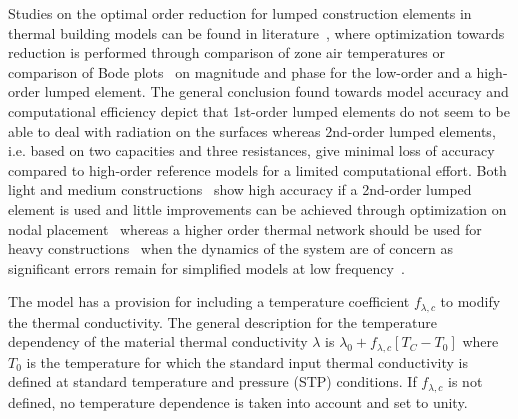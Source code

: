 
Studies on the optimal order reduction for lumped construction elements in thermal building models can be found in literature~\cite{Tindale1993,Gouda2000,Gouda2002,Wang2006,Xu2007}, where optimization towards reduction is performed through comparison of zone air temperatures or comparison of Bode plots~\cite{Bode1945} on magnitude and phase for the low-order and a high-order lumped element. The general conclusion found towards model accuracy and computational efficiency depict that 1st-order lumped elements do not seem to be able to deal with radiation on the surfaces whereas 2nd-order lumped elements, i.e. based on two capacities and three resistances, give minimal loss of accuracy compared to high-order reference models for a limited computational effort. Both light and medium constructions~\cite{ASHRAE2009} show high accuracy if a 2nd-order lumped element is used and little improvements can be achieved through optimization on nodal placement~\cite{Tindale1993,Gouda2002,Wang2006,Xu2007} whereas a higher order thermal network should be used for heavy constructions~\cite{ASHRAE2009} when the dynamics of the system are of concern as significant errors remain for simplified models at low frequency~\cite{Wang2006,Xu2007,Masy2008}.

The model has a provision for including a temperature coefficient $f_{\lambda,c}$ to modify the thermal conductivity. The general description for the temperature dependency of the material thermal conductivity $\lambda$ is $\lambda_{0} + f_{\lambda,c}\left[T_{C}-T_{0}\right]$ where $T_{0}$ is the temperature for which the standard input thermal conductivity is defined at standard temperature and pressure (STP) conditions. If $f_{\lambda,c}$ is not defined, no temperature dependence is taken into account and set to unity.



